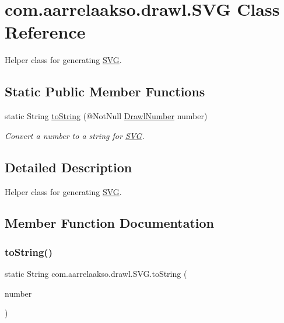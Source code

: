 \hypertarget{classcom_1_1aarrelaakso_1_1drawl_1_1_s_v_g}{}\section{com.\+aarrelaakso.\+drawl.\+S\+VG Class Reference}
\label{classcom_1_1aarrelaakso_1_1drawl_1_1_s_v_g}


Helper class for generating \hyperlink{classcom_1_1aarrelaakso_1_1drawl_1_1_s_v_g}{S\+VG}.  


\subsection*{Static Public Member Functions}
\begin{DoxyCompactItemize}
\item 
static String \hyperlink{classcom_1_1aarrelaakso_1_1drawl_1_1_s_v_g_a42e1312eca53f124d5bd97a543e9d436}{to\+String} (@Not\+Null \hyperlink{classcom_1_1aarrelaakso_1_1drawl_1_1_drawl_number}{Drawl\+Number} number)
\begin{DoxyCompactList}\small\item\em Convert a number to a string for \hyperlink{classcom_1_1aarrelaakso_1_1drawl_1_1_s_v_g}{S\+VG}. \end{DoxyCompactList}\end{DoxyCompactItemize}


\subsection{Detailed Description}
Helper class for generating \hyperlink{classcom_1_1aarrelaakso_1_1drawl_1_1_s_v_g}{S\+VG}. 

\subsection{Member Function Documentation}
\mbox{\label{classcom_1_1aarrelaakso_1_1drawl_1_1_s_v_g_a42e1312eca53f124d5bd97a543e9d436}} 
\subsubsection{\texorpdfstring{to\+String()}{toString()}}
{\footnotesize\ttfamily static String com.\+aarrelaakso.\+drawl.\+S\+V\+G.\+to\+String (\begin{DoxyParamCaption}\item[{@Not\+Null \hyperlink{classcom_1_1aarrelaakso_1_1drawl_1_1_drawl_number}{Drawl\+Number}}]{number }\end{DoxyParamCaption})\hspace{0.3cm}{\ttfamily [static]}}



